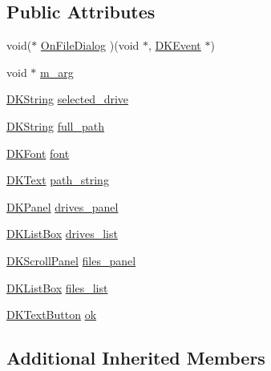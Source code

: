\subsection*{Public Attributes}
\begin{DoxyCompactItemize}
\item 
void($\ast$ \hyperlink{class_d_k_file_dialog_ac32768df68e6cd883697ec2ee38e3aa1}{On\-File\-Dialog} )(void $\ast$, \hyperlink{class_d_k_event}{D\-K\-Event} $\ast$)
\item 
void $\ast$ \hyperlink{class_d_k_file_dialog_a464acd6ab35aefc96d018cb2b78adf96}{m\-\_\-arg}
\item 
\hyperlink{_d_k_string_8h_ac168e8555ceba18e1a2919b21976bc84}{D\-K\-String} \hyperlink{class_d_k_file_dialog_acc5d715fec68bffde3a6d884c0f9ebef}{selected\-\_\-drive}
\item 
\hyperlink{_d_k_string_8h_ac168e8555ceba18e1a2919b21976bc84}{D\-K\-String} \hyperlink{class_d_k_file_dialog_a9fd97e695f47289399f95322f19bd457}{full\-\_\-path}
\item 
\hyperlink{class_d_k_font}{D\-K\-Font} \hyperlink{class_d_k_file_dialog_aebe78c2fd6444d16df89031a94a7d155}{font}
\item 
\hyperlink{class_d_k_text}{D\-K\-Text} \hyperlink{class_d_k_file_dialog_ab0539d16c59186286391d99c9195f6d2}{path\-\_\-string}
\item 
\hyperlink{class_d_k_panel}{D\-K\-Panel} \hyperlink{class_d_k_file_dialog_af20ef313d8c2cc9d34da481145e59cde}{drives\-\_\-panel}
\item 
\hyperlink{class_d_k_list_box}{D\-K\-List\-Box} \hyperlink{class_d_k_file_dialog_a4cbafeb900b8ad329e5cd8a6b5851a03}{drives\-\_\-list}
\item 
\hyperlink{class_d_k_scroll_panel}{D\-K\-Scroll\-Panel} \hyperlink{class_d_k_file_dialog_a0a10f27ef6994acfddcfc7304220fa1a}{files\-\_\-panel}
\item 
\hyperlink{class_d_k_list_box}{D\-K\-List\-Box} \hyperlink{class_d_k_file_dialog_a0e3005f1d9ce634d24cd8704fdcd411e}{files\-\_\-list}
\item 
\hyperlink{class_d_k_text_button}{D\-K\-Text\-Button} \hyperlink{class_d_k_file_dialog_aaf1214e298f4f755e667fa59a2f5d3e5}{ok}
\end{DoxyCompactItemize}
\subsection*{Additional Inherited Members}


